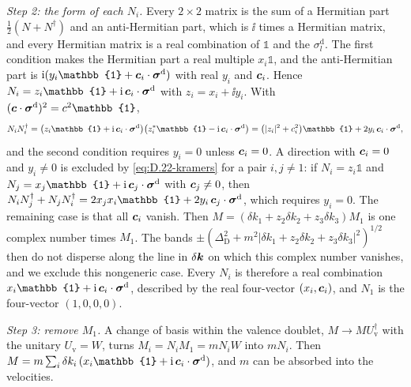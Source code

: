 \emph{Step 2: the form of each $N_i$.} Every $2\times2$ matrix is the sum of a Hermitian part $\frac12(N + N^\dagger)$ and an anti-Hermitian part, which is $\ii$ times a Hermitian matrix, and every Hermitian matrix is a real combination of $\mathbb{1}$ and the $\sigma^{\mathrm{d}}_l$. The first condition makes the Hermitian part a real multiple $x_i\mathbb{1}$, and the anti-Hermitian part is $\ii(y_i\mathbb{1} + \vect{c}_i\cdot\boldsymbol{\sigma}^{\mathrm{d}})$ with real $y_i$ and $\bm{c}_i$. Hence $N_i = z_i\mathbb{1} + \ii\,\vect{c}_i\cdot\boldsymbol{\sigma}^{\mathrm{d}}$ with $z_i = x_i + \ii y_i$. With $(\vect{c}\cdot\boldsymbol{\sigma}^{\mathrm{d}})^2 = c^2\mathbb{1}$,
\begin{equation*}
  N_iN_i^\dagger = \bigl(z_i\mathbb{1} + \ii\,\vect{c}_i\cdot\boldsymbol{\sigma}^{\mathrm{d}}\bigr)\bigl(z_i^*\mathbb{1} - \ii\,\vect{c}_i\cdot\boldsymbol{\sigma}^{\mathrm{d}}\bigr) = \bigl(|z_i|^2 + c_i^2\bigr)\mathbb{1} + 2y_i\,\vect{c}_i\cdot\boldsymbol{\sigma}^{\mathrm{d}} ,
\end{equation*}
and the second condition requires $y_i = 0$ unless $\bm{c}_i = 0$. A direction with $\bm{c}_i = 0$ and $y_i \ne 0$ is excluded by \cref{eq:D.22-kramers} for a pair $i, j \ne 1$: if $N_i = z_i\mathbb{1}$ and $N_j = x_j\mathbb{1} + \ii\,\vect{c}_j\cdot\boldsymbol{\sigma}^{\mathrm{d}}$ with $\bm{c}_j \ne 0$, then $N_iN_j^\dagger + N_jN_i^\dagger = 2x_jx_i\mathbb{1} + 2y_i\,\vect{c}_j\cdot\boldsymbol{\sigma}^{\mathrm{d}}$, which requires $y_i = 0$. The remaining case is that all $\bm{c}_i$ vanish. Then $M = (\delta k_1 + z_2\delta k_2 + z_3\delta k_3)M_1$ is one complex number times $M_1$. The bands $\pm(\Delta_{\mathrm{D}}^2 + m^2|\delta k_1 + z_2\delta k_2 + z_3\delta k_3|^2)^{1/2}$ then do not disperse along the line in $\delta\bm{k}$ on which this complex number vanishes, and we exclude this nongeneric case. Every $N_i$ is therefore a real combination $x_i\mathbb{1} + \ii\,\vect{c}_i\cdot\boldsymbol{\sigma}^{\mathrm{d}}$, described by the real four-vector $(x_i, \bm{c}_i)$, and $N_1$ is the four-vector $(1, 0, 0, 0)$.

\emph{Step 3: remove $M_1$.} A change of basis within the valence doublet, $M \to MU_{\mathrm{v}}^\dagger$ with the unitary $U_{\mathrm{v}} = W$, turns $M_i = N_iM_1 = mN_iW$ into $mN_i$. Then $M = m\sum_i\delta k_i\,(x_i\mathbb{1} + \ii\,\vect{c}_i\cdot\boldsymbol{\sigma}^{\mathrm{d}})$, and $m$ can be absorbed into the velocities.

